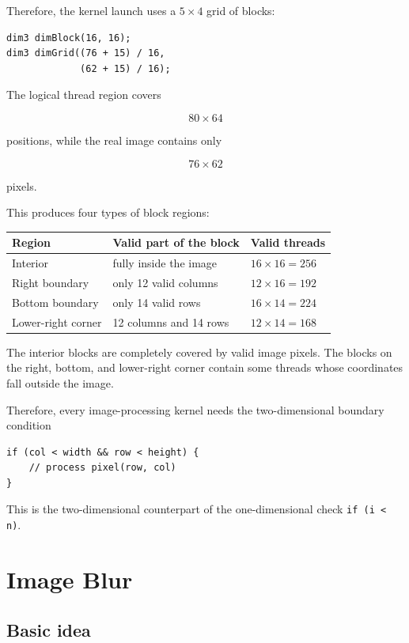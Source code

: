 \documentclass[11pt,a4paper]{article}
\begin{document}
Therefore, the kernel launch uses a \(5\times4\) grid of blocks:

\begin{lstlisting}
dim3 dimBlock(16, 16);
dim3 dimGrid((76 + 15) / 16,
             (62 + 15) / 16);
\end{lstlisting}

The logical thread region covers

\[
80\times64
\]

positions, while the real image contains only

\[
76\times62
\]

pixels.

This produces four types of block regions:

\begin{center}
\begin{tabular}{lll}
\toprule
Region & Valid part of the block & Valid threads \\
\midrule
Interior & fully inside the image & \(16\times16=256\) \\
Right boundary & only 12 valid columns & \(12\times16=192\) \\
Bottom boundary & only 14 valid rows & \(16\times14=224\) \\
Lower-right corner & 12 columns and 14 rows & \(12\times14=168\) \\
\bottomrule
\end{tabular}
\end{center}

The interior blocks are completely covered by valid image pixels. The blocks on the right, bottom, and lower-right corner contain some threads whose coordinates fall outside the image.

Therefore, every image-processing kernel needs the two-dimensional boundary condition

\begin{lstlisting}
if (col < width && row < height) {
    // process pixel(row, col)
}
\end{lstlisting}

This is the two-dimensional counterpart of the one-dimensional check \texttt{if (i < n)}.

\section{Image Blur}

\subsection{Basic idea}
\end{document}
